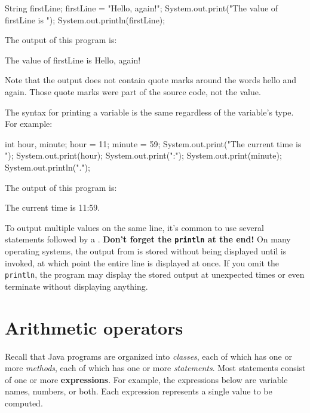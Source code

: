 \begin{code}
    String firstLine;
    firstLine = "Hello, again!";
    System.out.print("The value of firstLine is ");
    System.out.println(firstLine);
\end{code}

The output of this program is:

\begin{stdout}
The value of firstLine is Hello, again!
\end{stdout}

Note that the output does not contain quote marks around the words hello and again.
Those quote marks were part of the source code, not the value.

The syntax for printing a variable is the same regardless of the variable's type.
For example:

\begin{code}
    int hour, minute;
    hour = 11;
    minute = 59;
    System.out.print("The current time is ");
    System.out.print(hour);
    System.out.print(":");
    System.out.print(minute);
    System.out.println(".");
\end{code}

The output of this program is:

\begin{stdout}
The current time is 11:59.
\end{stdout}

To output multiple values on the same line, it's common to use several  statements followed by a .
{\bf Don't forget the {\tt println} at the end!}
On many operating systems, the output from  is stored without being displayed until  is invoked, at which point the entire line is displayed at once.
If you omit the {\tt println}, the program may display the stored output at unexpected times or even terminate without displaying anything.


\section{Arithmetic operators}


Recall that Java programs are organized into {\em classes}, each of which has one or more {\em methods}, each of which has one or more {\em statements}.
Most statements consist of one or more {\bf expressions}.
For example, the expressions below are variable names, numbers, or both.
Each expression represents a single value to be computed.

